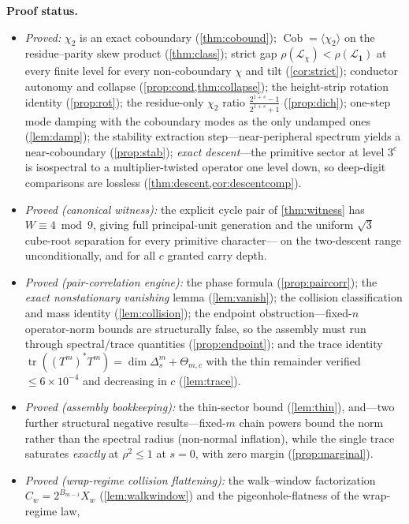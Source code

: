 \documentclass[11pt]{article}
\newcommand{\Lcal}{\mathcal{L}}
\theoremstyle{plain}
\theoremstyle{definition}
\theoremstyle{remark}
\begin{document}
\noindent\textbf{Proof status.}
\begin{itemize}[leftmargin=1.6em,itemsep=1pt]
\item \emph{Proved:} $\chi_2$ is an exact coboundary (\cref{thm:cobound});
$\operatorname{Cob}=\langle\chi_2\rangle$ on the residue--parity skew product
(\cref{thm:class}); strict gap $\rho(\Lcal_\chi)<\rho(\Lcal_{\mathbf1})$ at every
finite level for every non-coboundary $\chi$ and tilt (\cref{cor:strict});
conductor autonomy and collapse (\cref{prop:cond,thm:collapse}); the
height-strip rotation identity (\cref{prop:rot}); the residue-only $\chi_2$
ratio $\tfrac{2^{1+s}-1}{2^{1+s}+1}$ (\cref{prop:dich}); one-step mode damping
with the coboundary modes as the only undamped ones (\cref{lem:damp}); the
stability extraction step---near-peripheral spectrum yields a near-coboundary
(\cref{prop:stab}); \emph{exact descent}---the primitive sector at level $3^c$
is isospectral to a multiplier-twisted operator one level down, so deep-digit
comparisons are lossless (\cref{thm:descent,cor:descentcomp}).
\item \emph{Proved (canonical witness):} the explicit cycle pair of
\cref{thm:witness} has $W\equiv4\bmod9$, giving full principal-unit generation
and the uniform $\sqrt3$ cube-root separation for every primitive character---%
on the two-descent range unconditionally, and for all $c$ granted carry depth.
\item \emph{Proved (pair-correlation engine):} the phase formula
(\cref{prop:paircorr}); the \emph{exact nonstationary vanishing} lemma
(\cref{lem:vanish}); the collision classification and mass identity
(\cref{lem:collision}); the endpoint obstruction---fixed-$n$ operator-norm
bounds are structurally false, so the assembly must run through spectral/trace
quantities (\cref{prop:endpoint}); and the trace identity
$\operatorname{tr}((T^m)^*T^m)=\dim\Delta_s^m+\Theta_{m,c}$ with the thin
remainder verified $\le6\times10^{-4}$ and decreasing in $c$
(\cref{lem:trace}).
\item \emph{Proved (assembly bookkeeping):} the thin-sector bound
(\cref{lem:thin}), and---two further structural negative results---fixed-$m$
chain powers bound the norm rather than the spectral radius (non-normal
inflation), while the single trace saturates \emph{exactly} at $\rho^2\le1$ at
$s=0$, with zero margin (\cref{prop:marginal}).
\item \emph{Proved (wrap-regime collision flattening):} the walk--window
factorization $C_w=2^{B_{m-1}}X_w$ (\cref{lem:walkwindow}) and the
pigeonhole-flatness of the wrap-regime law,

\end{itemize}
\end{document}
